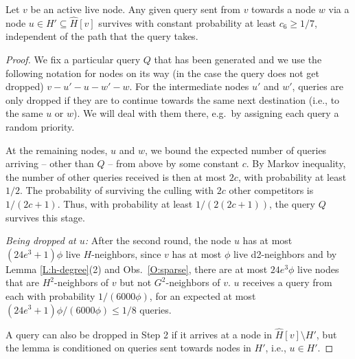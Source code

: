 \begin{lemma} Let $v$ be an active live node. 
Any given query sent from $v$ towards a node $w$ via a node $u\in H'\subseteq \hat{H}[v]$ survives with constant probability at least $c_6 \ge 1/7$, independent of the path that the query takes.
\label{L:survival}
\end{lemma}
\iffalse %
\begin{proof}
We fix a particular query $Q$ that has been generated and we use the following notation for nodes on its way (in the case the query does not get dropped) $v-u'-u-w'-w$.
For the intermediate nodes $u'$ and $w'$, queries are only dropped if they are to continue towards the same next destination (i.e., to the same $u$ or $w$). We will deal with them there, e.g.\ by assigning each query a random priority.

At the remaining nodes, $u$ and $w$, we bound the expected number of queries arriving -- other than $Q$ -- from above by some constant $c$. By Markov inequality, the number of other queries received is then at most $2c$, with probability at least $1/2$. The probability of surviving the culling with $2c$ other competitors is $1/(2c+1)$. 
Thus, with probability at least $1/(2(2c+1))$, the query $Q$ survives this stage.


\textit{Being dropped at $u$:} After the second round, the node $u$ has at most $(24e^3+1)\phi$ live $H$-neighbors, since $v$ has at most $\phi$ live d2-neighbors and by Lemma \ref{L:h-degree}(2) and Obs.~\ref{O:sparse}, 
there are at most $24e^3\phi$ live nodes that are $H^2$-neighbors of $v$ but not $G^2$-neighbors of $v$. $u$ receives a query from each with probability $1/(6000\phi)$, for an expected at most $(24e^3+1)\phi/(6000\phi) \le 1/8$ queries.

A query can also be dropped in Step 2 if it arrives at a node in $\hat{H}[v] \setminus H'$, but the lemma is conditioned on queries sent towards nodes in $H'$, i.e., $u\in H'$. 


\end{proof}
